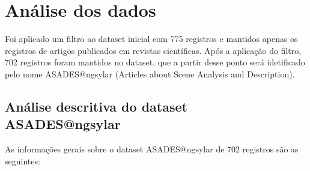 \section{Análise dos dados}

Foi aplicado um filtro ao dataset inicial com 775 registros e mantidos apenas os registros de artigos publicados em revistas científicas. Após a aplicação do filtro, 702 registros foram mantidos no dataset, que a partir desse ponto será idetificado pelo nome ASADES@ngsylar (Articles about Scene Analysis and Description).

\subsection{Análise descritiva do dataset ASADES@ngsylar}

As informações gerais sobre o dataset ASADES@ngsylar de 702 registros são as seguintes:

